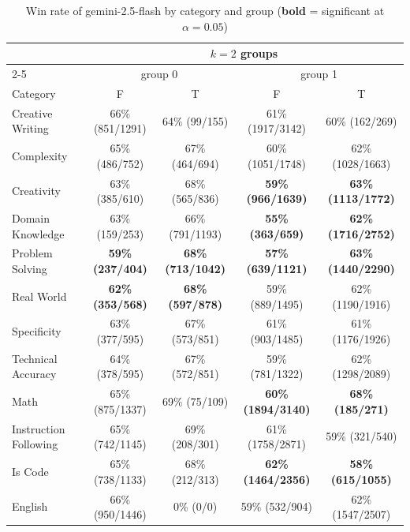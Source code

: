 \begin{table}[ht]
\centering
\scriptsize
\setlength{\tabcolsep}{3pt}
\renewcommand{\arraystretch}{1.2}
\caption{Win rate of gemini-2.5-flash by category and group (\textbf{bold} = significant at $\alpha=0.05$)}
\label{tab:winrate_2}
\begin{tabular}{lcccc}
\toprule
 & \multicolumn{4}{c}{$k=2$ groups} \\
\cmidrule(lr){2-5}
 & \multicolumn{2}{c}{group 0} & \multicolumn{2}{c}{group 1} \\
Category & F & T & F & T \\
\midrule
Creative Writing & 66\% (851/1291) & 64\% (99/155) & 61\% (1917/3142) & 60\% (162/269) \\
Complexity & 65\% (486/752) & 67\% (464/694) & 60\% (1051/1748) & 62\% (1028/1663) \\
Creativity & 63\% (385/610) & 68\% (565/836) & \textbf{59\% (966/1639)} & \textbf{63\% (1113/1772)} \\
Domain Knowledge & 63\% (159/253) & 66\% (791/1193) & \textbf{55\% (363/659)} & \textbf{62\% (1716/2752)} \\
Problem Solving & \textbf{59\% (237/404)} & \textbf{68\% (713/1042)} & \textbf{57\% (639/1121)} & \textbf{63\% (1440/2290)} \\
Real World & \textbf{62\% (353/568)} & \textbf{68\% (597/878)} & 59\% (889/1495) & 62\% (1190/1916) \\
Specificity & 63\% (377/595) & 67\% (573/851) & 61\% (903/1485) & 61\% (1176/1926) \\
Technical Accuracy & 64\% (378/595) & 67\% (572/851) & 59\% (781/1322) & 62\% (1298/2089) \\
Math & 65\% (875/1337) & 69\% (75/109) & \textbf{60\% (1894/3140)} & \textbf{68\% (185/271)} \\
Instruction Following & 65\% (742/1145) & 69\% (208/301) & 61\% (1758/2871) & 59\% (321/540) \\
Is Code & 65\% (738/1133) & 68\% (212/313) & \textbf{62\% (1464/2356)} & \textbf{58\% (615/1055)} \\
English & 66\% (950/1446) & 0\% (0/0) & 59\% (532/904) & 62\% (1547/2507) \\
\bottomrule
\end{tabular}
\end{table}